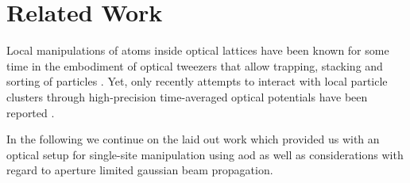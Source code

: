 \section{Related Work}

Local manipulations of atoms inside optical lattices have been known for some
time in the embodiment of optical tweezers that allow trapping, stacking and
sorting of particles \cite{Tadmor2004}. Yet, only recently attempts to
interact with local particle clusters through high-precision time-averaged
optical potentials have been reported \cite{Roy2016}.

In the following we continue on the laid out work \cite{Hertlein2017} which
provided us with an optical setup for single-site manipulation using
\gls{aod} as well as considerations with regard to aperture limited
gaussian beam propagation.
